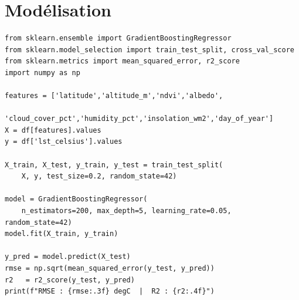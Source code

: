 \documentclass[a4paper,12pt]{report}
\begin{document}
\section{Mod\'elisation}

\begin{lstlisting}[style=python, caption={modelisation.py --- Entra\^inement et \'evaluation des mod\`eles}]
from sklearn.ensemble import GradientBoostingRegressor
from sklearn.model_selection import train_test_split, cross_val_score
from sklearn.metrics import mean_squared_error, r2_score
import numpy as np

features = ['latitude','altitude_m','ndvi','albedo',
            'cloud_cover_pct','humidity_pct','insolation_wm2','day_of_year']
X = df[features].values
y = df['lst_celsius'].values

X_train, X_test, y_train, y_test = train_test_split(
    X, y, test_size=0.2, random_state=42)

model = GradientBoostingRegressor(
    n_estimators=200, max_depth=5, learning_rate=0.05, random_state=42)
model.fit(X_train, y_train)

y_pred = model.predict(X_test)
rmse = np.sqrt(mean_squared_error(y_test, y_pred))
r2   = r2_score(y_test, y_pred)
print(f"RMSE : {rmse:.3f} degC  |  R2 : {r2:.4f}")
\end{lstlisting}
\end{document}
